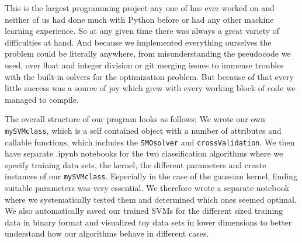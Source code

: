 This is the largest programming project any one of has ever worked on and neither of us had done much with Python before or had any other machine learning experience. So at any given time there was always a great variety of difficulties at hand. And because we implemented everything ourselves the problem could be literally anywhere, from misunderstanding the pseudocode we used, over float and integer division or git merging issues to immense troubles with the built-in solvers for the optimization problem. But because of that every little success was a source of joy which grew with every working block of code we managed to compile.

\smallskip
The overall structure of our program looks as follows: We wrote our own \texttt{mySVMclass}, which is a self contained object with a number of attributes and callable functions, which includes the \texttt{SMOsolver} and \texttt{crossValidation}. We then have separate .ipynb notebooks for the two classification algorithms where we specify training data sets, the kernel, the different parameters and create instances of our \texttt{mySVMclass}. Especially in the case of the gaussian kernel, finding suitable parameters was very essential. We therefore wrote a separate notebook where we systematically tested them and determined which ones seemed optimal. We also automatically saved our trained SVMs for the different sized training data in binary format and visualized toy data sets in lower dimensions to better understand how our algorithms behave in different cases.

